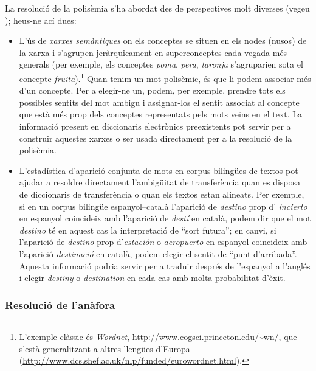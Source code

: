 La resolució de la polisèmia s'ha abordat des de perspectives molt
diverses (vegeu \citet{ide98j}); heus-ne ací dues:
\begin{itemize}
\item L'ús de \emph{xarxes semàntiques} on els conceptes se situen en
  els nodes (nusos) de la xarxa i s'agrupen jeràrquicament en
  superconceptes cada vegada més generals (per exemple, els conceptes
  \emph{poma}, \emph{pera}, \emph{taronja} s'agruparien sota el
  concepte \emph{fruita}).\footnote{L'exemple clàssic és
    \emph{Wordnet}, \url{http://www.cogsci.princeton.edu/~wn/},
    que s'està generalitzant a altres llengües d'Europa
    (\url{http://www.dcs.shef.ac.uk/nlp/funded/eurowordnet.html}).}
  Quan tenim un mot polisèmic, és que li podem associar més d'un
  concepte. Per a elegir-ne un, podem, per exemple, prendre tots els
  possibles sentits del mot ambigu i assignar-los el sentit associat
  al concepte que està més prop dels conceptes representats pels mots
  veïns en el text.  La informació present en diccionaris electrònics
  preexistents pot servir per a construir aquestes xarxes o ser usada
  directament per a la resolució de la polisèmia.
\item L'estadística d'aparició conjunta de mots en corpus bilingües de
  textos pot ajudar a resoldre directament l'ambigüitat de
  transferència quan es disposa de diccionaris de transferència o quan
  els textos estan alineats. Per exemple, si en un corpus bilingüe
  espanyol--català l'aparició de \emph{destino} prop d'{\em
    incierto} en espanyol coincideix amb l'aparició de \emph{destí}
  en català, podem dir que el mot \emph{destino} té en aquest cas la interpretació de ``sort futura''; en canvi, si l'aparició de {\em
    destino} prop d'\emph{estación} o \emph{aeropuerto} en espanyol
  coincideix amb l'aparició \emph{destinació} en català, podem elegir
  el sentit de ``punt d'arribada''. Aquesta informació podria servir
  per a traduir després de l'espanyol a l'anglés i elegir {\em
    destiny} o \emph{destination} en cada cas amb molta
  probabilitat d'èxit.
\end{itemize}


\subsubsection{Resolució de l'anàfora}

